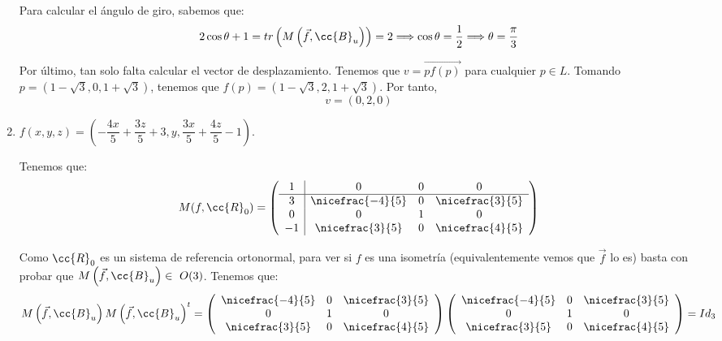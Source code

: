 \begin{ejercicio}
\begin{enumerate}
        Para calcular el ángulo de giro, sabemos que:
        \begin{equation*}
            2\cos\theta +1 = tr\left(M\left(\vec{f}, \cc{B}_u\right)\right) = 2 \Longrightarrow \cos\theta = \frac{1}{2} \Longrightarrow \theta = \frac{\pi}{3}
        \end{equation*}

        Por último, tan solo falta calcular el vector de desplazamiento. Tenemos que $v=\vec{pf(p)}$ para cualquier $p\in L$. Tomando $p=(1-\sqrt{3}, 0, 1+\sqrt{3})$, tenemos que $f(p) = (1-\sqrt{3}, 2, 1+\sqrt{3})$. Por tanto,
        \begin{equation*}
            v = (0, 2, 0)
        \end{equation*}

        
        \item $f\left(x, y, z\right) = \left(-\dfrac{4x}{5} + \dfrac{3z}{5} + 3, y, \dfrac{3x}{5} + \dfrac{4z}{5} - 1\right)$.

        Tenemos que:
        \begin{equation*}
            M(f,\cc{R}_0) = \left(\begin{array}{c|ccc}
                1 & 0 & 0 & 0 \\ \hline
                3 & \nicefrac{-4}{5} & 0 & \nicefrac{3}{5} \\
                0 & 0 & 1 & 0 \\
                -1 & \nicefrac{3}{5} & 0 & \nicefrac{4}{5} 
            \end{array}\right)
        \end{equation*}

        Como $\cc{R}_0$ es un sistema de referencia ortonormal, para ver si $f$ es una isometría (equivalentemente vemos que $\vec{f}$ lo es) basta con probar que $M\left(\vec{f}, \cc{B}_u\right)\in~O(3)$. Tenemos que:
        \begin{equation*}
            M\left(\vec{f},\cc{B}_u\right)M\left(\vec{f},\cc{B}_u\right)^t
            = 
            \left(
            \begin{array}{ccc}
                \nicefrac{-4}{5} & 0 & \nicefrac{3}{5} \\
                0 & 1 & 0 \\
                \nicefrac{3}{5} & 0 & \nicefrac{4}{5}
            \end{array}
            \right)
            \left(
            \begin{array}{ccc}
                \nicefrac{-4}{5} & 0 & \nicefrac{3}{5} \\
                0 & 1 & 0 \\
                \nicefrac{3}{5} & 0 & \nicefrac{4}{5}
            \end{array}
            \right)
            = Id_3
        \end{equation*}


\end{enumerate}
\end{ejercicio}
